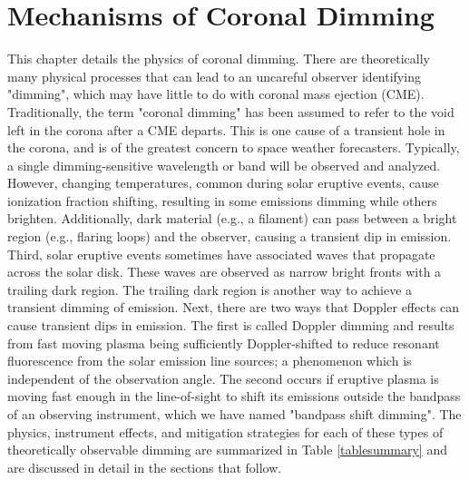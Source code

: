 \chapter{Mechanisms of Coronal Dimming}
\label{chaptermechanisms}

This chapter details the physics of coronal dimming. There are theoretically many physical processes that can lead to an uncareful observer identifying "dimming", which may have little to do with coronal mass ejection (CME). Traditionally, the term "coronal dimming" has been assumed to refer to the void left in the corona after a CME departs. This is one cause of a transient hole in the corona, and is of the greatest concern to space weather forecasters. Typically, a single dimming-sensitive wavelength or band will be observed and analyzed. However, changing temperatures, common during solar eruptive events, cause ionization fraction shifting, resulting in some emissions dimming while others brighten. Additionally, dark material (e.g., a filament) can pass between a bright region (e.g., flaring loops) and the observer, causing a transient dip in emission. Third, solar eruptive events sometimes have associated waves that propagate across the solar disk. These waves are observed as narrow bright fronts with a trailing dark region. The trailing dark region is another way to achieve a transient dimming of emission. Next, there are two ways that Doppler effects can cause transient dips in emission. The first is called Doppler dimming and results from fast moving plasma being sufficiently Doppler-shifted to reduce resonant fluorescence from the solar emission line sources; a phenomenon which is independent of the observation angle. The second occurs if eruptive plasma is moving fast enough in the line-of-sight to shift its emissions outside the bandpass of an observing instrument, which we have named "bandpass shift dimming". The physics, instrument effects, and mitigation strategies for each of these types of theoretically observable dimming are summarized in Table \ref{tablesummary} and are discussed in detail in the sections that follow.

